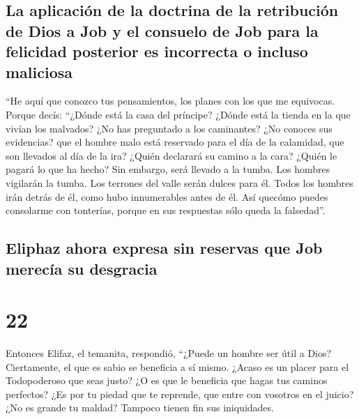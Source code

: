 \hypertarget{la-aplicaciuxf3n-de-la-doctrina-de-la-retribuciuxf3n-de-dios-a-job-y-el-consuelo-de-job-para-la-felicidad-posterior-es-incorrecta-o-incluso-maliciosa}{%
\subsection{La aplicación de la doctrina de la retribución de Dios a Job
y el consuelo de Job para la felicidad posterior es incorrecta o incluso
maliciosa}\label{la-aplicaciuxf3n-de-la-doctrina-de-la-retribuciuxf3n-de-dios-a-job-y-el-consuelo-de-job-para-la-felicidad-posterior-es-incorrecta-o-incluso-maliciosa}}

 ``He aquí que conozco tus pensamientos, los planes con
los que me equivocas.  Porque decís: ``¿Dónde está la
casa del príncipe? ¿Dónde está la tienda en la que vivían los malvados?
 ¿No has preguntado a los caminantes? ¿No conoces sus
evidencias?  que el hombre malo está reservado para el
día de la calamidad, que son llevados al día de la ira? 
¿Quién declarará su camino a la cara? ¿Quién le pagará lo que ha hecho?
 Sin embargo, será llevado a la tumba. Los hombres
vigilarán la tumba.  Los terrones del valle serán dulces
para él. Todos los hombres irán detrás de él, como hubo innumerables
antes de él.  Así quecómo puedes consolarme con
tonterías, porque en sus respuestas sólo queda la falsedad''.

\hypertarget{eliphaz-ahora-expresa-sin-reservas-que-job-merecuxeda-su-desgracia}{%
\subsection{Eliphaz ahora expresa sin reservas que Job merecía su
desgracia}\label{eliphaz-ahora-expresa-sin-reservas-que-job-merecuxeda-su-desgracia}}

\hypertarget{section-21}{%
\section{22}\label{section-21}}

 Entonces Elifaz, el temanita, respondió, 
``¿Puede un hombre ser útil a Dios? Ciertamente, el que es sabio se
beneficia a sí mismo.  ¿Acaso es un placer para el
Todopoderoso que seas justo? ¿O es que le beneficia que hagas tus
caminos perfectos?  ¿Es por tu piedad que te reprende, que
entre con vosotros en el juicio?  ¿No es grande tu maldad?
Tampoco tienen fin sus iniquidades.

